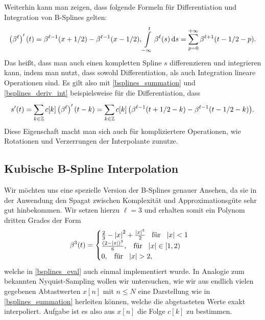 Weiterhin kann man zeigen, dass folgende Formeln f\"ur Differentiation und Integration von B-Splines gelten:
\begin{equation}\label{bsplines_deriv_int}
    \left(\beta^\ell\right)^\prime(t) =
        \beta^{\ell-1}(x + 1/2) - \beta^{\ell-1}(x - 1/2), 
    {\int\limits_{-\infty}^{t}{\beta^\ell(s)}\,\mathrm{d}{s}} = 
        {\sum\limits_{p = 0}^{+\infty}{\beta^{\ell+1}(t - 1/2 - p)}}.
\end{equation}
Das hei{\ss}t, dass man auch einen kompletten Spline $s$ differenzieren und integrieren kann, indem man nutzt, dass sowohl Differentiation, als auch Integration lineare Operationen sind. Es gilt also mit \eqref{bsplines_summation} und \eqref{bsplines_deriv_int} beispielsweise f\"ur die Differentiation, dass
\begin{equation}
    s^\prime(t) = {\sum\limits_{k \in \mathbb{Z}}^{}{
        c[k] \left(\beta^{\ell}\right)^\prime(t - k)
    }}
    = {\sum\limits_{k \in \mathbb{Z}}^{}{
        c[k]\left(
            \beta^{\ell-1}(t + 1/2 - k) - \beta^{\ell-1}(t - 1/2 - k)
        \right)
    }}.
\end{equation}
%
Diese Eigenschaft macht man sich auch f\"ur kompliziertere Operationen, wie Rotationen und Verzerrungen der Interpolante zunutze.
%
%
\subsection{Kubische B-Spline Interpolation}
%
%
Wir m\"ochten uns eine spezielle Version der B-Splines genauer Ansehen, da sie in der Anwendung den Spagat zwischen Komplexit\"at und Approximationsg\"ute sehr gut hinbekommen. Wir setzen hierzu $\ell=3$ und erhalten somit ein Polynom dritten Grades der Form
\begin{equation}
    \beta^3(t) = \begin{cases}
        \frac 23 - {\left| x \right|}^2 + \frac{{\left| x \right|}^3}{2} {\hspace{3mm} \text{f\"ur} \hspace{3mm}} {\left| x \right|} < 1\\
        \frac{(2 - {\left| x \right|})^3}{6}, {\hspace{3mm} \text{f\"ur} \hspace{3mm}} {\left| x \right|} \in [1, 2) \\
        0, {\hspace{3mm} \text{f\"ur} \hspace{3mm}} {\left| x \right|} > 2,
    \end{cases}
\end{equation}
welche in \cref{bsplines_eval} auch einmal implementiert wurde. In Analogie zum bekannten Nyquist-Sampling wollen wir untersuchen, wie wir aus endlich vielen gegebenen Abtastwerten $x[n]$ mit $n \leqslant N$ eine Darstellung wie in \eqref{bsplines_summation} herleiten k\"onnen, welche die abgetasteten Werte exakt interpoliert. Aufgabe ist es also aus $x[n]$ die Folge $c[k]$ zu bestimmen.

